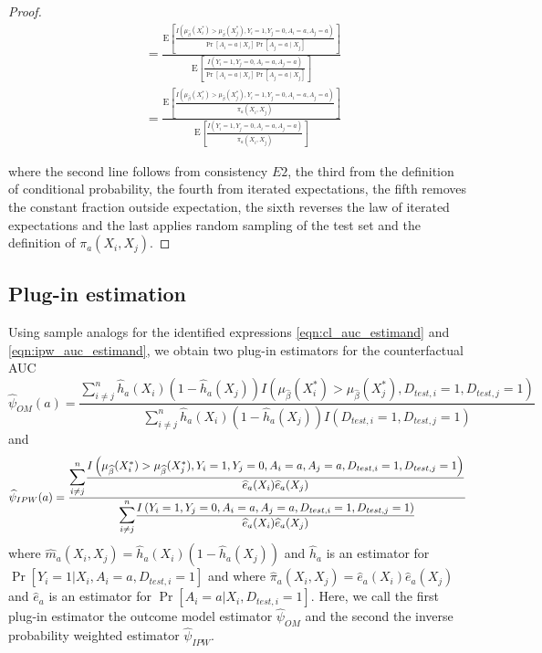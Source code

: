 \begin{proof}
$$\begin{aligned}
& = \frac{\mathrm{E}\left[\frac{I\left(\mu_{\widehat{\beta}}(X_i^*)>\mu_{\widehat{\beta}}(X_j^*), Y_i=1, Y_j=0, A_i = a, A_j = a\right)}{\operatorname{Pr}\left[A_i = a \mid X_i\right] \operatorname{Pr}\left[A_j = a \mid X_j\right]} \right]}{\mathrm{E}\left[\frac{I\left(Y_i=1, Y_j=0, A_i = a, A_j = a\right)}{\operatorname{Pr}[A_i = a \mid X_i] \Pr[A_j = a \mid X_j]}\right]} \\
& = \frac{\mathrm{E}\left[\frac{I\left(\mu_{\widehat{\beta}}(X_i^*)>\mu_{\widehat{\beta}}(X_j^*), Y_i=1, Y_j=0, A_i = a, A_j = a\right)}{\pi_a(X_i, X_j)} \right]}{\mathrm{E}\left[\frac{I\left(Y_i=1, Y_j=0, A_i = a, A_j = a\right)}{\pi_a(X_i, X_j)}\right]} 
\end{aligned}
$$

   
where the second line follows from consistency $E2$, the third from the definition of conditional probability, the fourth from iterated expectations, the fifth removes the constant fraction outside expectation, the sixth reverses the law of iterated expectations and the last applies random sampling of the test set and the definition of $\pi_a(X_i, X_j)$.
\end{proof}

\subsection{Plug-in estimation}
Using sample analogs for the identified expressions \ref{eqn:cl_auc_estimand} and \ref{eqn:ipw_auc_estimand}, we obtain two plug-in estimators for the counterfactual AUC
    \begin{equation*}
        \widehat{\psi}_{OM}(a) = \frac{\sum_{i \neq j}^n\widehat{h}_a(X_i) (1 - \widehat{h}_a(X_j)) I(\mu_{\widehat{\beta}}(X_i^*)>\mu_{\widehat{\beta}}(X_j^*), D_{test, i} = 1,  D_{test, j} = 1) }{\sum_{i \neq j}^n\widehat{h}_a(X_i) (1 - \widehat{h}_a(X_j)) I(D_{test, i} = 1,  D_{test, j} = 1)}
    \end{equation*}
    and 
    \begin{equation*}
        \widehat{\psi}_{IPW}(a) = \frac{\mathlarger{\mathlarger{\sum}}_{i \neq j}^n \dfrac{I\left(\mu_{\widehat{\beta}}(X_i^*)>\mu_{\widehat{\beta}}(X_j^*), Y_i = 1, Y_j = 0, A_i = a, A_j = a, D_{test, i} = 1,  D_{test, j} = 1\right)}{\widehat{e}_a(X_i) \widehat{e}_a(X_j)}}{\mathlarger{\mathlarger{\sum}}_{i \neq j}^n\dfrac{I\left(Y_i = 1, Y_j = 0, A_i = a, A_j = a, D_{test, i} = 1,  D_{test, j} = 1\right)}{\widehat{e}_a(X_i) \widehat{e}_a(X_j)}}
    \end{equation*}
    where $\widehat{m}_a(X_i, X_j) = \widehat{h}_a(X_i) (1 - \widehat{h}_a(X_j))$ and $\widehat{h}_a$ is an estimator for $\operatorname{Pr}[Y_i=1 | X_i,A_i = a, D_{test,i} = 1]$ and where $\widehat{\pi}_a(X_i, X_j) = \widehat{e}_a(X_i) \widehat{e}_a(X_j)$ and $\widehat{e}_a$ is an estimator for $\Pr[A_i = a | X_i, D_{test,i} = 1]$. Here, we call the first plug-in estimator the outcome model estimator $ \widehat{\psi}_{OM}$ and the second the inverse probability weighted estimator $\widehat{\psi}_{IPW}$. 


